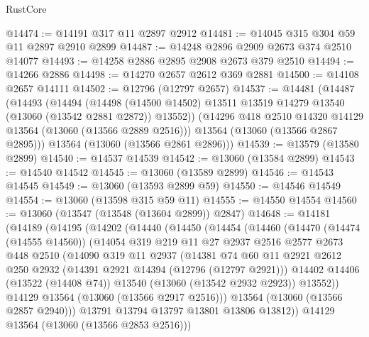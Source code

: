 \begin{lexlean}{RustCore}
\begin{coremodule}
@14474 := @14191 @317 @11 @2897 @2912
@14481 := @14045 @315 @304 @59 @11 @2897 @2910 @2899
@14487 := @14248 @2896 @2909 @2673 @374 @2510 @14077
@14493 := @14258 @2886 @2895 @2908 @2673 @379 @2510
@14494 := @14266 @2886
@14498 := @14270 @2657 @2612 @369 @2881
@14500 := @14108 @2657 @14111
@14502 := @12796 (@12797 @2657)
@14537 := @14481
    (@14487
      (@14493
        (@14494
          (@14498 (@14500 @14502) @13511 @13519 @14279 @13540 (@13060 (@13542 @2881 @2872)) @13552))
        (@14296 @418 @2510 @14320 @14129 @13564 (@13060 (@13566 @2889 @2516)))
        @13564
        (@13060 (@13566 @2867 @2895)))
      @13564
      (@13060 (@13566 @2861 @2896)))
@14539 := @13579 (@13580 @2899)
@14540 := @14537 @14539
@14542 := @13060 (@13584 @2899)
@14543 := @14540 @14542
@14545 := @13060 (@13589 @2899)
@14546 := @14543 @14545
@14549 := @13060 (@13593 @2899 @59)
@14550 := @14546 @14549
@14554 := @13060 (@13598 @315 @59 @11)
@14555 := @14550 @14554
@14560 := @13060 (@13547 (@13548 (@13604 @2899)) @2847)
@14648 := @14181
    (@14189
      (@14195
        (@14202
          (@14440
            (@14450
              (@14454
                (@14460
                  (@14470
                    (@14474 (@14555 @14560))
                    (@14054
                      @319
                      @219
                      @11
                      @27
                      @2937
                      @2516
                      @2577
                      @2673
                      @448
                      @2510
                      (@14090
                        @319
                        @11
                        @2937
                        (@14381
                          @74
                          @60
                          @11
                          @2921
                          @2612
                          @250
                          @2932
                          (@14391 @2921 @14394 (@12796 (@12797 @2921)))
                          @14402
                          @14406
                          (@13522 (@14408 @74))
                          @13540
                          (@13060 (@13542 @2932 @2923))
                          @13552))
                      @14129
                      @13564
                      (@13060 (@13566 @2917 @2516)))
                    @13564
                    (@13060 (@13566 @2857 @2940)))
                  @13791
                  @13794
                  @13797
                  @13801
                  @13806
                  @13812))
              @14129
              @13564
              (@13060 (@13566 @2853 @2516)))

\end{coremodule}
\end{lexlean}
